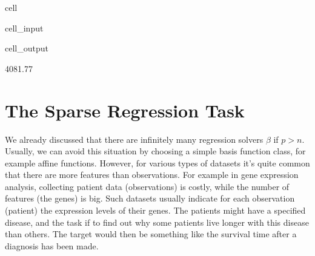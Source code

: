 \documentclass[letterpaper,10pt,english]{jupyterBook}
\begin{document}
\begin{sphinxuseclass}{cell}\begin{sphinxVerbatimInput}

\begin{sphinxuseclass}{cell_input}
\begin{sphinxVerbatim}[commandchars=\\\{\}]
\end{sphinxVerbatim}

\end{sphinxuseclass}\end{sphinxVerbatimInput}
\begin{sphinxVerbatimOutput}

\begin{sphinxuseclass}{cell_output}
\begin{sphinxVerbatim}[commandchars=\\\{\}]
4081.77
\end{sphinxVerbatim}

\end{sphinxuseclass}\end{sphinxVerbatimOutput}

\end{sphinxuseclass}
\sphinxstepscope


\section{The Sparse Regression Task}
\label{\detokenize{regression_sparse:the-sparse-regression-task}}\label{\detokenize{regression_sparse::doc}}
\sphinxAtStartPar
We already discussed that there are infinitely many regression solvers \(\beta\) if \(p>n\). Usually, we can avoid this situation by choosing a simple basis function class, for example affine functions. However, for various types of datasets it’s quite common that there are more features than observations. For example in gene expression analysis, collecting patient data (observations) is costly, while the number of features (the genes) is big. Such datasets usually indicate for each observation (patient) the expression levels of their genes. The patients might have a specified disease, and the task if to find out why some patients live longer with this disease than others. The target would then be something like the survival time after a diagnosis has been made.
\end{document}
